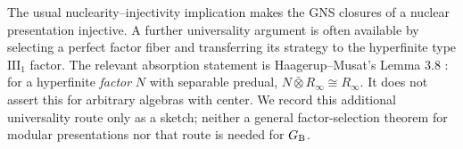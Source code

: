 \begin{remark}
The usual nuclearity--injectivity implication makes the GNS closures of a nuclear presentation injective. A further universality argument is often available by selecting a perfect factor fiber and transferring its strategy to the hyperfinite type $\mathrm{III}_1$ factor. The relevant absorption statement is Haagerup--Musat's Lemma 3.8 \cite{HM}: for a hyperfinite \emph{factor} $N$ with separable predual, $N\bar\otimes R_\infty\cong R_\infty$. It does not assert this for arbitrary algebras with center. We record this additional universality route only as a sketch; neither a general factor-selection theorem for modular presentations nor that route is needed for $G_{\mathrm B}$.
\end{remark}
